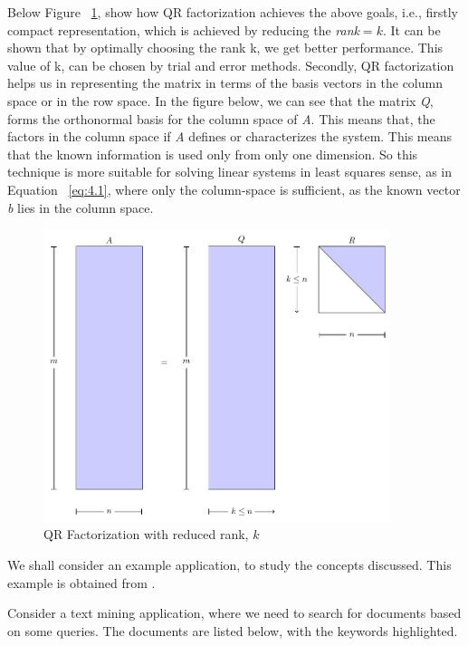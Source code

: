 Below Figure ~\ref{fig:QR Factorization}, show how QR factorization achieves the
above goals, i.e., firstly compact representation, which is achieved by reducing
the \emph{rank}$=k$. It can be shown that by optimally choosing the rank k, we
get better performance. 
This value of k, can be chosen by trial and error methods. Secondly, QR
factorization helps us in representing the matrix in terms of the basis vectors
in the column space or in the row space. In the figure below, we can see that
the matrix \emph{Q}, forms the orthonormal basis for the column space of
\emph{A}. This means that, the factors in the column space if \emph{A} defines
or characterizes the system. This means that the known information is used only
from only one dimension. So this technique is more suitable for solving linear
systems in least squares sense, as in Equation ~\ref{eq:4.1}, where only the
column-space is sufficient, as the known vector \emph{b} lies in the column
space. 
\begin{figure}[h!]

\includegraphics[width=0.9\textwidth]{QR_Fig.pdf}
\caption{QR Factorization with reduced rank, $k$}
\label{fig:QR Factorization}
\end{figure}


We shall consider an example application, to study the concepts discussed. This
example is obtained from \cite{eld-mm:07}. 
\begin{example}
 Consider a text mining application, where we need to search for documents based
on some queries. The documents are listed below, with the keywords highlighted. 

\end{example}



